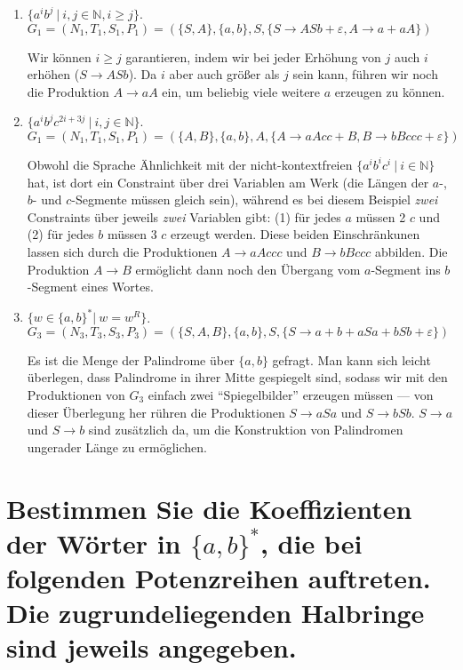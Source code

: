 \documentclass[]{scrartcl}
\newcommand{\e}{\varepsilon}
\newcommand{\grule}[2]{#1 \rightarrow #2}
\begin{document}
\begin{enumerate}
	\item $\{a^ib^j\ |\ i,j \in \mathbb{N}, i \geq j \}$.\\
		
	$ G_1 = (N_1,T_1,S_1,P_1) = (\{S,A\}, \{a,b\}, S, \{ \grule{S}{ASb + \e}, \grule{A}{a + aA}\})
	$
	
	Wir können $i \geq j$ garantieren, indem wir bei jeder Erhöhung von $j$ auch $i$ erhöhen ($\grule{S}{ASb}$). Da $i$ aber auch größer als $j$ sein kann, führen wir noch die Produktion $\grule{A}{aA}$ ein, um beliebig viele weitere $a$ erzeugen zu können.
	
	\item $\{a^ib^jc^{2i+3j}\ |\ i,j \in \mathbb{N} \}$.\\
	
	$G_1 = (N_1,T_1,S_1,P_1) = (\{A,B\}, \{a,b\}, A, \{ \grule{A}{aAcc + B}, \grule{B}{bBccc + \e}\})$
	
	Obwohl die Sprache Ähnlichkeit mit der nicht-kontextfreien $\{a^ib^ic^i\ |\ i \in \mathbb{N} \}$ hat, ist dort ein Constraint über drei Variablen am Werk (die Längen der $a$-, $b$- und $c$-Segmente müssen gleich sein), während es bei diesem Beispiel {\em zwei} Constraints über jeweils {\em zwei} Variablen gibt: (1) für jedes $a$ müssen 2 $c$ und (2) für jedes $b$ müssen 3 $c$ erzeugt werden. Diese beiden Einschränkunen lassen sich durch die Produktionen $\grule{A}{aAccc}$ und $\grule{B}{bBccc}$ abbilden. Die Produktion $\grule{A}{B}$ ermöglicht dann noch den Übergang vom $a$-Segment ins $b$-Segment eines Wortes.

	\item $\{w \in \{a,b\}^* |\ w = w^R \}$.\\
	
	$G_3 = (N_3,T_3,S_3,P_3) = (\{S,A,B\}, \{a,b\}, S, \{\grule{S}{a + b + aSa + bSb + \e}\})$
	
	Es ist die Menge der Palindrome über $\{a,b\}$ gefragt. Man kann sich leicht überlegen, dass Palindrome in ihrer Mitte gespiegelt sind, sodass wir mit den Produktionen von $G_3$ einfach zwei ``Spiegelbilder'' erzeugen müssen --- von dieser Überlegung her rühren die Produktionen $\grule{S}{aSa}$ und $\grule{S}{bSb}$. $\grule{S}{a}$ und $\grule{S}{b}$ sind zusätzlich da, um die Konstruktion von Palindromen ungerader Länge zu ermöglichen.
\end{enumerate}


\setcounter{section}{4}

\section{Bestimmen Sie die Koeffizienten der Wörter in $\{a,b\}^*$, die bei folgenden Potenzreihen auftreten. Die zugrundeliegenden Halbringe sind jeweils angegeben.}
\end{document}
